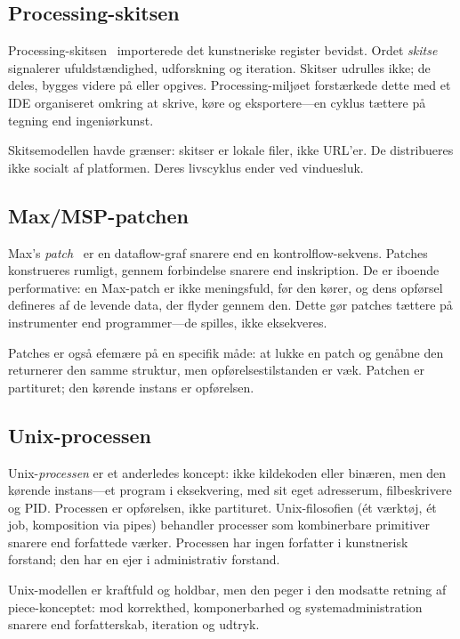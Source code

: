 \documentclass[10pt,letterpaper,twocolumn]{article}
\begin{document}
\subsection{Processing-skitsen}

Processing-skitsen~\citep{reas2007processing} importerede det kunstneriske register bevidst. Ordet \emph{skitse} signalerer ufuldstændighed, udforskning og iteration. Skitser udrulles ikke; de deles, bygges videre på eller opgives. Processing-miljøet forstærkede dette med et IDE organiseret omkring at skrive, køre og eksportere---en cyklus tættere på tegning end ingeniørkunst.

Skitsemodellen havde grænser: skitser er lokale filer, ikke URL'er. De distribueres ikke socialt af platformen. Deres livscyklus ender ved vinduesluk.

\subsection{Max/MSP-patchen}

Max's \emph{patch}~\citep{puckette1988patcher,puckette1996pure} er en dataflow-graf snarere end en kontrolflow-sekvens. Patches konstrueres rumligt, gennem forbindelse snarere end inskription. De er iboende performative: en Max-patch er ikke meningsfuld, før den kører, og dens opførsel defineres af de levende data, der flyder gennem den. Dette gør patches tættere på instrumenter end programmer---de spilles, ikke eksekveres.

Patches er også efemære på en specifik måde: at lukke en patch og genåbne den returnerer den samme struktur, men opførelsestilstanden er væk. Patchen er partituret; den kørende instans er opførelsen.

\subsection{Unix-processen}

Unix-\emph{processen} er et anderledes koncept: ikke kildekoden eller binæren, men den kørende instans---et program i eksekvering, med sit eget adresserum, filbeskrivere og PID. Processen er opførelsen, ikke partituret. Unix-filosofien (ét værktøj, ét job, komposition via pipes) behandler processer som kombinerbare primitiver snarere end forfattede værker. Processen har ingen forfatter i kunstnerisk forstand; den har en ejer i administrativ forstand.

Unix-modellen er kraftfuld og holdbar, men den peger i den modsatte retning af piece-konceptet: mod korrekthed, komponerbarhed og systemadministration snarere end forfatterskab, iteration og udtryk.
\end{document}
